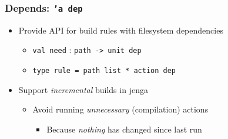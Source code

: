 \documentclass{beamer}
\begin{document}
% 


\begin{frame}[fragile]
\frametitle{Depends: {\tt 'a dep}}
\begin{itemize}
\item Provide API for build rules with filesystem dependencies
\begin{itemize}
\item {\tt val need} : {\tt path -> unit dep}
\item {\tt type rule = path list * action dep}
\end{itemize}
\item Support {\em incremental}\/ builds in jenga
\begin{itemize}
\item Avoid running {\em unnecessary} (compilation) actions
\begin{itemize}
\item Because {\em nothing} has changed since last run
\end{itemize}
\end{itemize}
\end{itemize}
\end{frame}


% 
% 

\end{document}
